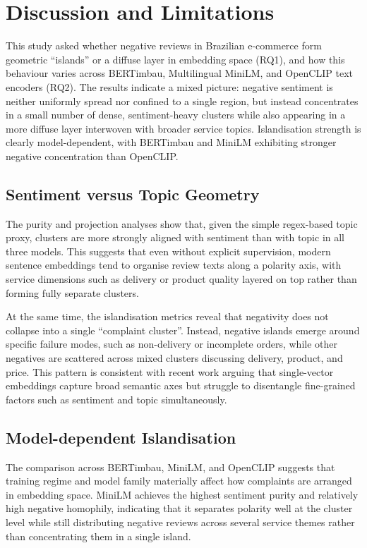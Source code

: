 \documentclass[a4paper,11pt]{article}
\begin{document}
\section{Discussion and Limitations}
\label{sec:discussion}

This study asked whether negative reviews in Brazilian e-commerce form geometric ``islands'' or a diffuse layer in embedding space (RQ1), and how this behaviour varies across BERTimbau, Multilingual MiniLM, and OpenCLIP text encoders (RQ2). 
The results indicate a mixed picture: negative sentiment is neither uniformly spread nor confined to a single region, but instead concentrates in a small number of dense, sentiment-heavy clusters while also appearing in a more diffuse layer interwoven with broader service topics. 
Islandisation strength is clearly model-dependent, with BERTimbau and MiniLM exhibiting stronger negative concentration than OpenCLIP.
\subsection{Sentiment versus Topic Geometry}

The purity and projection analyses show that, given the simple regex-based topic proxy, clusters are more strongly aligned with sentiment than with topic in all three models. 
This suggests that even without explicit supervision, modern sentence embeddings tend to organise review texts along a polarity axis, with service dimensions such as delivery or product quality layered on top rather than forming fully separate clusters.

At the same time, the islandisation metrics reveal that negativity does not collapse into a single ``complaint cluster''. 
Instead, negative islands emerge around specific failure modes, such as non-delivery or incomplete orders, while other negatives are scattered across mixed clusters discussing delivery, product, and price. 
This pattern is consistent with recent work arguing that single-vector embeddings capture broad semantic axes but struggle to disentangle fine-grained factors such as sentiment and topic simultaneously.
\subsection{Model-dependent Islandisation}

The comparison across BERTimbau, MiniLM, and OpenCLIP suggests that training regime and model family materially affect how complaints are arranged in embedding space. 
MiniLM achieves the highest sentiment purity and relatively high negative homophily, indicating that it separates polarity well at the cluster level while still distributing negative reviews across several service themes rather than concentrating them in a single island.
\end{document}
